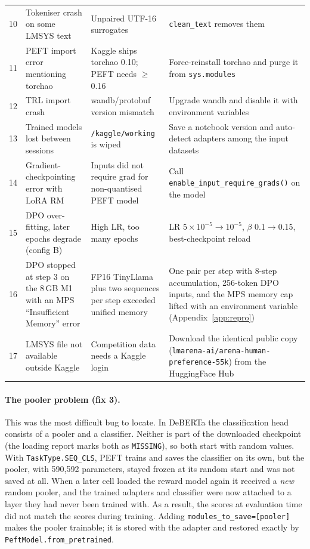 {\begin{longtable}{@{}L{0.5cm}L{4.0cm}L{4.3cm}L{5.0cm}@{}}
10 & Tokeniser crash on some LMSYS text & Unpaired UTF-16 surrogates & \texttt{clean\_text} removes them\\
11 & PEFT import error mentioning torchao & Kaggle ships torchao 0.10; PEFT needs $\ge$0.16 & Force-reinstall torchao and purge it from \texttt{sys.modules}\\
12 & TRL import crash & wandb/protobuf version mismatch & Upgrade wandb and disable it with environment variables\\
13 & Trained models lost between sessions & \texttt{/kaggle/working} is wiped & Save a notebook version and auto-detect adapters among the input datasets\\
14 & Gradient-checkpointing error with LoRA RM & Inputs did not require grad for non-quantised PEFT model & Call \texttt{enable\_input\_}\allowbreak\texttt{require\_grads()} on the model\\
15 & DPO over-fitting, later epochs degrade (config B) & High LR, too many epochs & LR $5\!\times\!10^{-5}\!\to\!10^{-5}$, $\beta$ 0.1$\to$0.15, best-checkpoint reload\\
16 & DPO stopped at step 3 on the 8\,GB M1 with an MPS ``Insufficient Memory'' error & FP16 TinyLlama plus two sequences per step exceeded unified memory & One pair per step with 8-step accumulation, 256-token DPO inputs, and the MPS memory cap lifted with an environment variable (Appendix~\ref{app:repro})\\
17 & LMSYS file not available outside Kaggle & Competition data needs a Kaggle login & Download the identical public copy (\texttt{lmarena-ai/}\allowbreak\texttt{arena-human-preference-55k}) from the HuggingFace Hub\\
\end{longtable}
}

\paragraph{The pooler problem (fix 3).} This was the most difficult bug to locate. In DeBERTa the classification head consists of a pooler and a classifier. Neither is part of the downloaded checkpoint (the loading report marks both as \texttt{MISSING}), so both start with random values. With \texttt{TaskType.SEQ\_CLS}, PEFT trains and saves the classifier on its own, but the pooler, with 590,592 parameters, stayed frozen at its random start and was not saved at all. When a later cell loaded the reward model again it received a \emph{new} random pooler, and the trained adapters and classifier were now attached to a layer they had never been trained with. As a result, the scores at evaluation time did not match the scores during training. Adding \texttt{modules\_to\_save=[\textquotedbl{}pooler\textquotedbl{}]} makes the pooler trainable; it is stored with the adapter and restored exactly by \texttt{PeftModel.from\_pretrained}.

